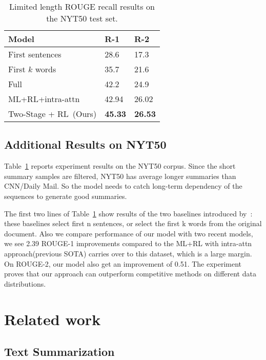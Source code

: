 \documentclass{article}
\begin{document}
\begin{table}[htpb]  
\centering
\begin{tabular}{l|ll}
\hline
Model                 & R-1                         & R-2       \\ \hline
First sentences	      & 28.6         		        &  17.3           \\
First $k$ words  & 35.7         		        &  21.6              \\ \hline
Full~\cite{Durrett2016}      & 42.2                        &  24.9      \\ \hline
ML+RL+intra-attn~\cite{Paulus2018} & 42.94                 &  26.02  \\ \hline
Two-Stage + RL~(Ours)                       & \textbf{45.33} & \textbf{26.53}      \\ \hline
\end{tabular}
\caption{Limited length ROUGE recall results on the NYT50 test set.\label{r2}}
\end{table}

\subsection{Additional Results on NYT50}

Table~\ref{r2} reports experiment results on the NYT50 corpus. Since the short summary samples are filtered, NYT50 has average longer summaries than CNN/Daily Mail. So the model needs to catch long-term dependency of the sequences to generate good summaries.

The first two lines of Table~\ref{r2} show results of the two baselines introduced by~\cite{Durrett2016}: these baselines select first n sentences, or select the first k words from the original document. Also we compare performance of our model with two recent models, we see 2.39 ROUGE-1 improvements compared to the ML+RL with intra-attn approach(previous SOTA) carries over to this dataset, which is a large margin. On ROUGE-2, our model also get an improvement of 0.51. The experiment proves that our approach can outperform competitive methods on different data distributions.

\section{Related work}

\subsection{Text Summarization}
\end{document}
